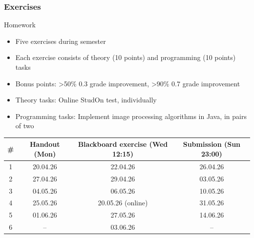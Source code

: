 \begin{frame}
	\frametitle{Exercises}
	\begin{block}{Homework}
		\begin{itemize}
			\item Five exercises during semester
			\item Each exercise consists of theory (10 points) and programming (10 points) tasks
			\item Bonus points: >50\% 0.3 grade improvement, >90\% 0.7 grade improvement
			\item Theory tasks: Online StudOn test, individually
			\item Programming tasks: Implement image processing algorithms in Java, in pairs of two
		\end{itemize}
		\begin{center}
			\begin{tabular}{c | c | c | c}
				\# & Handout (Mon) 	& Blackboard exercise (Wed 12:15)	& Submission (Sun 23:00) \\ \hline
				1  & 20.04.26    	& 22.04.26               				& 26.04.26       \\
				2  & 27.04.26    	& 29.04.26                				& 03.05.26       \\
				3  & 04.05.26    	& 06.05.26                				& 10.05.26       \\
				4  & 25.05.26    	& 20.05.26 (online)               	    & 31.05.26       \\
				5  & 01.06.26    	& 27.05.26                				& 14.06.26       \\
				6  & --    			& 03.06.26                				& --       \\
			\end{tabular}
		\end{center}
	\end{block}
\end{frame}

